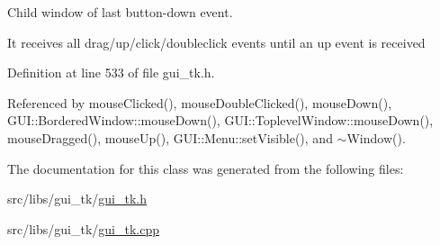 Child window of last button-\/down event. 

It receives all drag/up/click/doubleclick events until an up event is received 

Definition at line 533 of file gui\-\_\-tk.\-h.



Referenced by mouse\-Clicked(), mouse\-Double\-Clicked(), mouse\-Down(), G\-U\-I\-::\-Bordered\-Window\-::mouse\-Down(), G\-U\-I\-::\-Toplevel\-Window\-::mouse\-Down(), mouse\-Dragged(), mouse\-Up(), G\-U\-I\-::\-Menu\-::set\-Visible(), and $\sim$\-Window().



The documentation for this class was generated from the following files\-:\begin{DoxyCompactItemize}
\item 
src/libs/gui\-\_\-tk/\hyperlink{gui__tk_8h}{gui\-\_\-tk.\-h}\item 
src/libs/gui\-\_\-tk/\hyperlink{gui__tk_8cpp}{gui\-\_\-tk.\-cpp}\end{DoxyCompactItemize}
